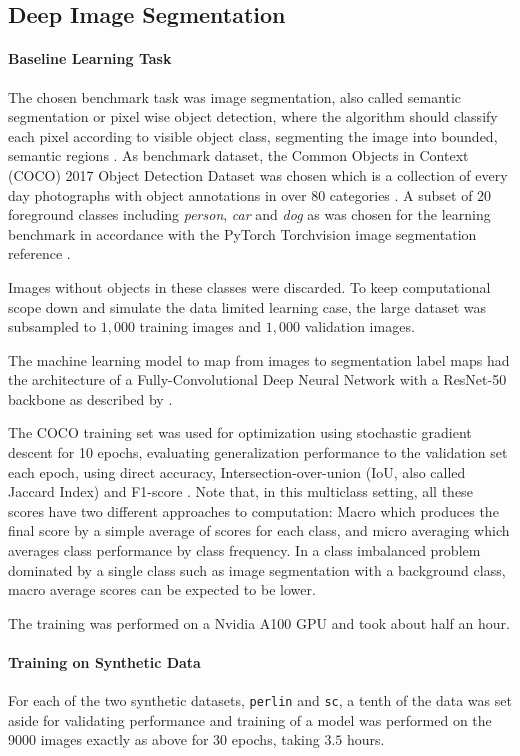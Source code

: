 \documentclass[12pt,fleqn]{article}
\begin{document}
\subsection{Deep Image Segmentation}
\paragraph{Baseline Learning Task}
The chosen benchmark task was image segmentation, also called semantic segmentation or pixel wise object detection, where the algorithm should classify each pixel according to visible object class, segmenting the image into bounded, semantic regions \cite{stockman2001cv}. 
As benchmark dataset, the Common Objects in Context (COCO) 2017 Object Detection Dataset was chosen which is a collection of every day photographs with object annotations in over 80 categories \cite{lin2014coco}.
A subset of 20 foreground classes including \emph{person}, \emph{car} and \emph{dog} as was chosen for the learning benchmark in accordance with the PyTorch Torchvision image segmentation reference \cite{falbel2022torch}.

Images without objects in these classes were discarded.
To keep computational scope down and simulate the data limited learning case, the large dataset was subsampled to $1,000$ training images and $1,000$ validation images.

The machine learning model to map from images to segmentation label maps had the architecture of a Fully-Convolutional Deep Neural Network with a ResNet-50 backbone as described by \citeauthor{shelhamer2017fully} \cite{shelhamer2017fully}.

The COCO training set was used for optimization using stochastic gradient descent for 10 epochs, evaluating generalization performance to the validation set each epoch, using direct accuracy, Intersection-over-union (IoU, also called Jaccard Index) and F1-score \cite{moral2019new}.
Note that, in this multiclass setting, all these scores have two different approaches to computation: Macro which produces the final score by a simple average of scores for each class, and micro averaging which averages class performance by class frequency.
In a class imbalanced problem dominated by a single class such as image segmentation with a background class, macro average scores can be expected to be lower.

The training was performed on a Nvidia A100 GPU and took about half an hour.

\paragraph{Training on Synthetic Data}
For each of the two synthetic datasets, \texttt{perlin} and \texttt{sc}, a tenth of the data was set aside for validating performance and training of a model was performed on the 9000 images exactly as above for 30 epochs, taking $3.5$ hours.
\end{document}
